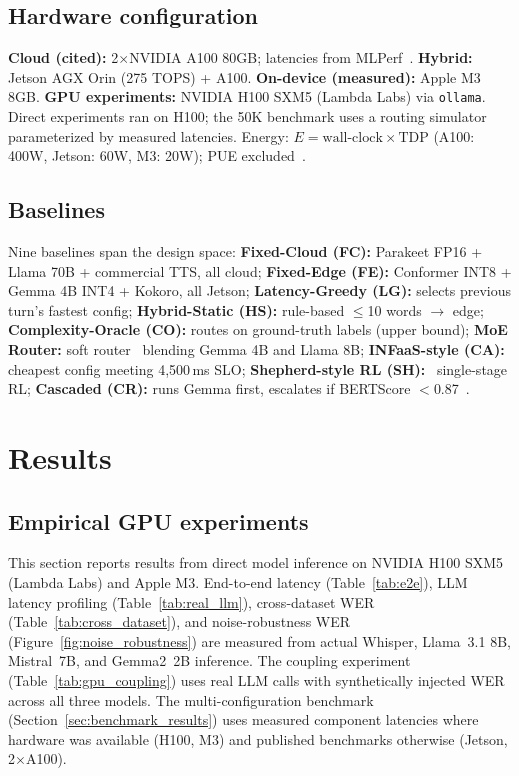 \documentclass{article}
\begin{document}
\subsection{Hardware configuration}

\textbf{Cloud (cited):} 2$\times$NVIDIA A100 80GB; latencies from MLPerf~\citep{mlperf2025}. \textbf{Hybrid:} Jetson AGX Orin (275 TOPS) + A100. \textbf{On-device (measured):} Apple M3 8GB. \textbf{GPU experiments:} NVIDIA H100 SXM5 (Lambda Labs) via \texttt{ollama}. Direct experiments ran on H100; the 50K benchmark uses a routing simulator parameterized by measured latencies. Energy: $E = \text{wall-clock} \times \text{TDP}$ (A100: 400W, Jetson: 60W, M3: 20W); PUE excluded~\citep{strubell2019energy}.

\subsection{Baselines}
\label{sec:baselines}

Nine baselines span the design space: \textbf{Fixed-Cloud (FC):} Parakeet FP16 + Llama 70B + commercial TTS, all cloud; \textbf{Fixed-Edge (FE):} Conformer INT8 + Gemma 4B INT4 + Kokoro, all Jetson; \textbf{Latency-Greedy (LG):} selects previous turn's fastest config; \textbf{Hybrid-Static (HS):} rule-based $\leq$10 words $\to$ edge; \textbf{Complexity-Oracle (CO):} routes on ground-truth labels (upper bound); \textbf{MoE Router:} soft router~\citep{shazeer2017moe} blending Gemma 4B and Llama 8B; \textbf{INFaaS-style (CA):}~\citep{romero2021infaas} cheapest config meeting 4{,}500\,ms SLO; \textbf{Shepherd-style RL (SH):}~\citep{gujarati2023shepherd} single-stage RL; \textbf{Cascaded (CR):} runs Gemma first, escalates if BERTScore $<$0.87~\citep{snell2024scaling}.

\section{Results}
\label{sec:results}

\subsection{Empirical GPU experiments}
\label{sec:gpu}

This section reports results from direct model inference on NVIDIA H100 SXM5 (Lambda Labs) and Apple M3. End-to-end latency (Table~\ref{tab:e2e}), LLM latency profiling (Table~\ref{tab:real_llm}), cross-dataset WER (Table~\ref{tab:cross_dataset}), and noise-robustness WER (Figure~\ref{fig:noise_robustness}) are measured from actual Whisper, Llama~3.1 8B, Mistral~7B, and Gemma2~2B inference. The coupling experiment (Table~\ref{tab:gpu_coupling}) uses real LLM calls with synthetically injected WER across all three models. The multi-configuration benchmark (Section~\ref{sec:benchmark_results}) uses measured component latencies where hardware was available (H100, M3) and published benchmarks otherwise (Jetson, 2$\times$A100).
\end{document}
